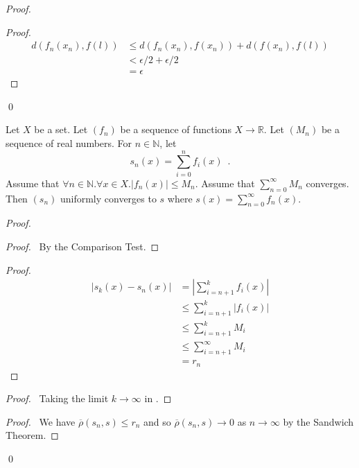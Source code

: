 \begin{proof}
\pf
{}
\begin{proof}
	\pf
	\begin{align*}
		d(f_n(x_n),f(l)) & \leq d(f_n(x_n),f(x_n)) + d(f(x_n),f(l)) \\
		& < \epsilon / 2 + \epsilon / 2 \\
		& = \epsilon
	\end{align*}
\end{proof}
\qed
\end{proof}

\begin{thm}
Let $X$ be a set. Let $(f_n)$ be a sequence of functions $X \rightarrow \mathbb{R}$. Let $(M_n)$ be a sequence of real numbers. For $n \in \mathbb{N}$, let
\[ s_n(x) = \sum_{i=0}^n f_i(x) \enspace . \]
Assume that $\forall n \in \mathbb{N}. \forall x \in X. |f_n(x)| \leq M_n$. Assume that $\sum_{n=0}^\infty M_n$ converges. Then $(s_n)$ uniformly converges to $s$ where $s(x) = \sum_{n=0}^\infty f_n(x)$.
\end{thm}

\begin{proof}
\pf
{}
\begin{proof}
	\pf\ By the Comparison Test.
\end{proof}
\begin{proof}
	\pf
	\begin{align*}
		|s_k(x) - s_n(x)| & = \left| \sum_{i=n+1}^k f_i(x) \right| \\
		& \leq \sum_{i=n+1}^k |f_i(x)| \\
		& \leq \sum_{i=n+1}^k M_i \\
		& \leq \sum_{i=n+1}^\infty M_i \\
		& = r_n
	\end{align*}
\end{proof}
\begin{proof}
	\pf\ Taking the limit $k \rightarrow \infty$ in .
\end{proof}
\begin{proof}
	\pf\ We have $\overline{\rho}(s_n,s) \leq r_n$ and so $\overline{\rho}(s_n,s) \rightarrow 0$ as $n \rightarrow \infty$ by the Sandwich Theorem.
\end{proof}
\qed
\end{proof}

